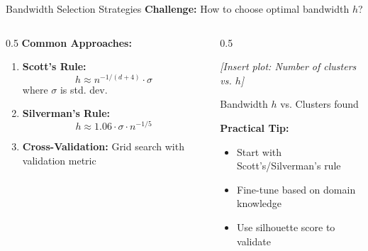 \begin{frame}{Bandwidth Selection Strategies}
    \textbf{Challenge:} How to choose optimal bandwidth $h$?

    \vspace{0.5cm}

    \begin{columns}[T]
        \begin{column}{0.5\textwidth}
            \textbf{Common Approaches:}
            \begin{enumerate}
                \item \textbf{Scott's Rule:}
                \[
                h \approx n^{-1/(d+4)} \cdot \sigma
                \]
                where $\sigma$ is std. dev.

                \vspace{0.3cm}

                \item \textbf{Silverman's Rule:}
                \[
                h \approx 1.06 \cdot \sigma \cdot n^{-1/5}
                \]

                \vspace{0.3cm}

                \item \textbf{Cross-Validation:}
                Grid search with validation metric
            \end{enumerate}
        \end{column}

        \begin{column}{0.5\textwidth}
            \begin{center}
                \textit{[Insert plot: Number of clusters vs. $h$]}

                \vspace{0.3cm}

                \small{Bandwidth $h$ vs. Clusters found}
            \end{center}

            \vspace{0.5cm}

            \textbf{Practical Tip:}
            \begin{itemize}
                \item Start with Scott's/Silverman's rule
                \item Fine-tune based on domain knowledge
                \item Use silhouette score to validate
            \end{itemize}
        \end{column}
    \end{columns}
\end{frame}

